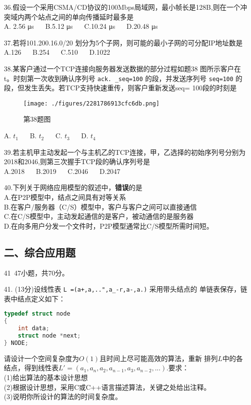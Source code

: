 36.假设一个采用CSMA/CD协议的100Mbps局域网，最小帧长是128B,则在一个冲突域内两个站点之间的单向传播延时最多是 \\
A. 2.56 μs $\quad$ B.5.12 μs $\quad$ C.10.24 μs
$\quad$ D.20.48 μs

37.若将101.200.16.0/20 划分为5个子网，则可能的最小子网的可分配IP地址数是 \\
A.126 $\quad$ B.254 $\quad$ C.510 $\quad$ D.1022

38.某客户通过一个TCP连接向服务器发送数据的部分过程如题38
图所示客户在t。时刻第一次收到确认序列号 \verb`ack. _seq=100` 的段，并发送序列号 \verb`seq=100` 的段，但发生丢失。若TCP支持快速重传，则客户重新发送seq= 100段的时刻是 \\
\begin{figure}[ht]
\centering
\texttt{[image: ./figures/2281786913cfc6db.png]}
\caption{第38题图} \label{fig_CSN19_2}
\end{figure}
A. $t_1$ $\quad$ B. $t_2$ $\quad$ C. $t_3$ $\quad$ D. $t_4$

39.若主机甲主动发起一个与主机乙的TCP连接，甲，乙选择的初始序列号分别为2018和2046,则第三次握手TCP段的确认序列号是 \\
A.2018 $\quad$ B.2019 $\quad$ C.2046 $\quad$ D.2047

40.下列关于网络应用模型的叙述中，\textbf{错误}的是 \\
A.在P2P模型中，结点之间具有对等关系 \\
B.在客户/服务器（C/S）模型中，客户与客户之间可以直接通信 \\
C.在C/S模型中，主动发起通信的是客户，被动通信的是服务器 \\
D.在向多用户分发一个文件时，P2P模型通常比C/S模型所需时间短。

\subsection{二、综合应用题}
41~47小题，共70分。

41. (13分)设线性表 \verb`L =(a+,a,..",a_-r,a-,a.)` 采用带头结点的
单链表保存，链表中结点定义如下：
\begin{lstlisting}[language=cpp]
typedef struct node
{
    int data;
    struct node *next;
} NODE;
\end{lstlisting}
请设计一个空间复杂度为$O(1)$且时间上尽可能高效的算法，重新
排列$L$中的各结点，得到线性表$L'=(a_1,a_n,a_2,a_{n-1},a_3,a_{n-2},...)$.要求： \\
(1)给出算法的基本设计思想 \\
(2)根据设计思想，采用C或C++语言描述算法，关键之处给出注释。 \\
(3)说明你所设计的算法的时间复杂度。

